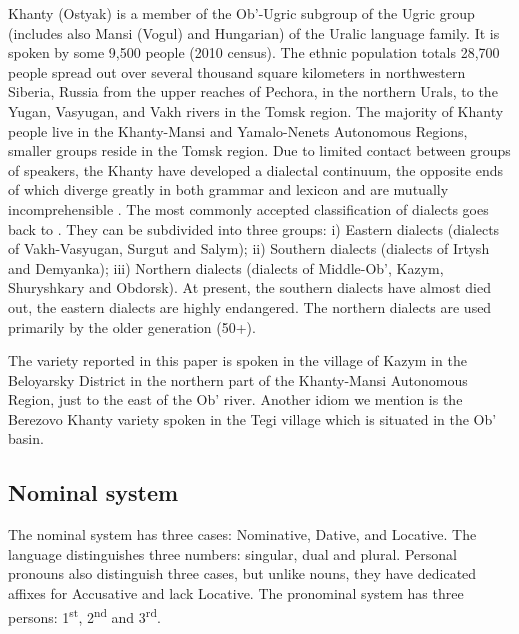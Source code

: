 \documentclass[output=paper]{langscibook}
\begin{document}
Khanty (Ostyak) is a member of the Ob’-Ugric subgroup of the Ugric group (includes also Mansi (Vogul) and Hungarian) of the Uralic language family. It is spoken by some 9,500 people (2010 census). The ethnic population totals 28,700 people spread out over several thousand square kilometers in northwestern Siberia, Russia \citep{LewisEtAl2013} from the upper reaches of Pechora, in the northern Urals, to the Yugan, Vasyugan, and Vakh rivers in the Tomsk region. The majority of Khanty people live in the Khanty-Mansi and Yamalo-Nenets Autonomous Regions, smaller groups reside in the Tomsk region. Due to limited contact between groups of speakers, the Khanty have developed a
dialectal continuum, the opposite ends of which diverge greatly in both grammar and lexicon and are mutually incomprehensible \citep{Nikolaeva1999Ostyak}. The most commonly accepted classification of dialects goes back to \citep{Steinitz1937}. They can be subdivided into three groups: i) Eastern dialects (dialects of Vakh-Vasyugan, Surgut and Salym); ii) Southern dialects (dialects of Irtysh and Demyanka); iii) Northern dialects (dialects of Middle-Ob’, Kazym, Shuryshkary and Obdorsk). At present, the southern dialects have almost died out, the eastern dialects are highly endangered. The northern dialects are used primarily by the older generation (50+). 

The variety reported in this paper is spoken in the village of Kazym in the Beloyarsky District in the northern part of the Khanty-Mansi Autonomous Region, just to the east of the Ob’ river. Another idiom we mention is the Berezovo Khanty variety spoken in the Tegi village which is situated in the Ob’ basin.

\subsection{{Nominal} {system}}\label{sec:Volkova:2.2}

The nominal system has three cases: Nominative, Dative, and Locative. The language distinguishes three numbers: singular, dual and plural. Personal pronouns also distinguish three cases, but unlike nouns, they have dedicated affixes for Accusative and lack Locative. The pronominal system has three persons: 1\textsuperscript{st}, 2\textsuperscript{nd} and 3\textsuperscript{rd}. 
\end{document}
